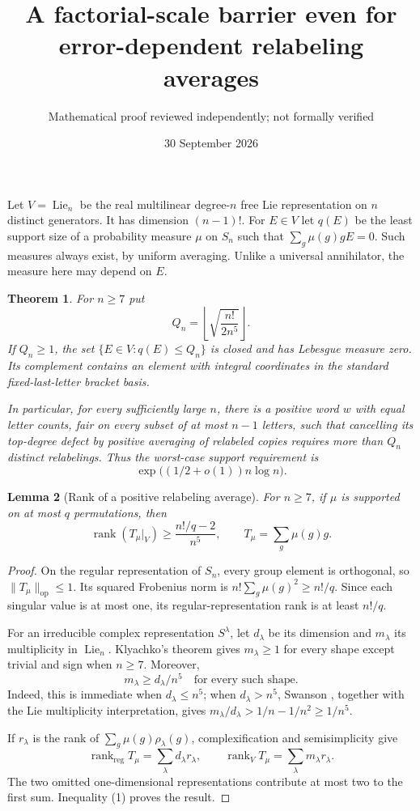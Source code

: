 \documentclass[11pt]{article}
\title{A factorial-scale barrier even for error-dependent relabeling averages}
\author{Mathematical proof reviewed independently; not formally verified}
\date{30 September 2026}
\newtheorem{theorem}{Theorem}
\newtheorem{lemma}[theorem]{Lemma}
\newcommand{\Lie}{\operatorname{Lie}}
\begin{document}
\maketitle
Let $V=\Lie_n$ be the real multilinear degree-$n$ free Lie
representation on $n$ distinct generators. It has dimension $(n-1)!$.
For $E\in V$ let $q(E)$ be the least support size of a probability
measure $\mu$ on $S_n$ such that
$\sum_g\mu(g)gE=0$. Such measures always exist, by uniform averaging.
Unlike a universal annihilator, the measure here may depend on $E$.

\begin{theorem}\label{main}
For $n\ge7$ put
\[
 Q_n=\left\lfloor\sqrt{\frac{n!}{2n^5}}\right\rfloor.
\]
If $Q_n\ge1$, the set $\{E\in V:q(E)\le Q_n\}$ is closed and has
Lebesgue measure zero. Its complement contains an element with integral
coordinates in the standard fixed-last-letter bracket basis.

In particular, for every sufficiently large $n$, there is a positive
word $w$ with equal letter counts, fair on every subset of at most
$n-1$ letters, such that cancelling its top-degree defect by positive
averaging of relabeled copies requires more than $Q_n$ distinct
relabelings. Thus the worst-case support requirement is
\[
 \exp\bigl((1/2+o(1))n\log n\bigr).
\]
\end{theorem}

\begin{lemma}[Rank of a positive relabeling average]\label{rank}
For $n\ge7$, if $\mu$ is supported on at most $q$ permutations, then
\[
 \operatorname{rank}(T_\mu|_V)\ge\frac{n!/q-2}{n^5},
 \qquad T_\mu=\sum_g\mu(g)g.
\]
\end{lemma}
\begin{proof}
On the regular representation of $S_n$, every group element is
orthogonal, so $\|T_\mu\|_{\mathrm{op}}\le1$. Its squared Frobenius
norm is $n!\sum_g\mu(g)^2\ge n!/q$. Since each singular value is at
most one, its regular-representation rank is at least $n!/q$.

For an irreducible complex representation $S^\lambda$, let $d_\lambda$
be its dimension and $m_\lambda$ its multiplicity in $\Lie_n$.
Klyachko's theorem gives $m_\lambda\ge1$ for every shape except trivial
and sign when $n\ge7$. Moreover,
\[
 m_\lambda\ge d_\lambda/n^5
 \quad\text{for every such shape}.\tag{1}
\]
Indeed, this is immediate when $d_\lambda\le n^5$; when
$d_\lambda>n^5$, Swanson \cite[Theorem 1.9]{swanson}, together
with the Lie multiplicity interpretation, gives
$m_\lambda/d_\lambda>1/n-1/n^2\ge1/n^5$.

If $r_\lambda$ is the rank of $\sum_g\mu(g)\rho_\lambda(g)$,
complexification and semisimplicity give
\[
 \operatorname{rank}_{\mathrm{reg}}T_\mu
   =\sum_\lambda d_\lambda r_\lambda,
 \qquad
 \operatorname{rank}_{V}T_\mu
   =\sum_\lambda m_\lambda r_\lambda.
\]
The two omitted one-dimensional representations contribute at most two
to the first sum. Inequality (1) proves the result.
\end{proof}
\end{document}
